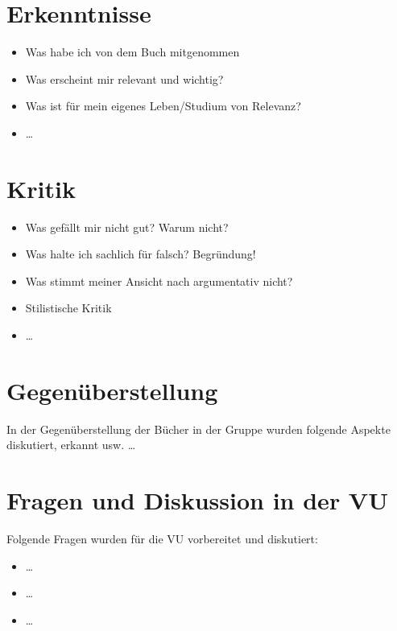 \documentclass[twoside, a4paper, DIV=11, open=any, bibliography=totoc]{scrbook}
\begin{document}
\section{Erkenntnisse} \label{sec:literkenntnis}

\begin{itemize}
    \item Was habe ich von dem Buch mitgenommen
    \item Was erscheint mir relevant und wichtig?
    \item Was ist für mein eigenes Leben/Studium von Relevanz?
    \item \ldots
\end{itemize}

\section{Kritik} \label{sec:litkritik}

\begin{itemize}
    \item Was gefällt mir nicht gut? Warum nicht?
    \item Was halte ich sachlich für falsch? Begründung!
    \item Was stimmt meiner Ansicht nach argumentativ nicht?
    \item Stilistische Kritik
    \item \ldots
\end{itemize}

\section{Gegenüberstellung} \label{sec:litgegenueber}

In der Gegenüberstellung der Bücher in der Gruppe wurden folgende Aspekte diskutiert, erkannt usw. \ldots

\section{Fragen und Diskussion in der VU} \label{sec:fragenvu}

Folgende Fragen wurden für die VU vorbereitet und diskutiert:

\begin{itemize}
    \item \ldots
    \item \ldots
    \item \ldots
\end{itemize}
\end{document}
